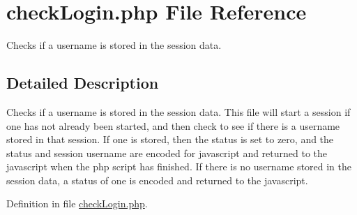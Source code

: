 \hypertarget{check_login_8php}{\section{check\-Login.\-php \-File \-Reference}
\label{check_login_8php}
}


\-Checks if a username is stored in the session data.  




\subsection{\-Detailed \-Description}
\-Checks if a username is stored in the session data. \-This file will start a session if one has not already been started, and then check to see if there is a username stored in that session. \-If one is stored, then the status is set to zero, and the status and session username are encoded for javascript and returned to the javascript when the php script has finished. \-If there is no username stored in the session data, a status of one is encoded and returned to the javascript. 

\-Definition in file \hyperlink{check_login_8php_source}{check\-Login.\-php}.

